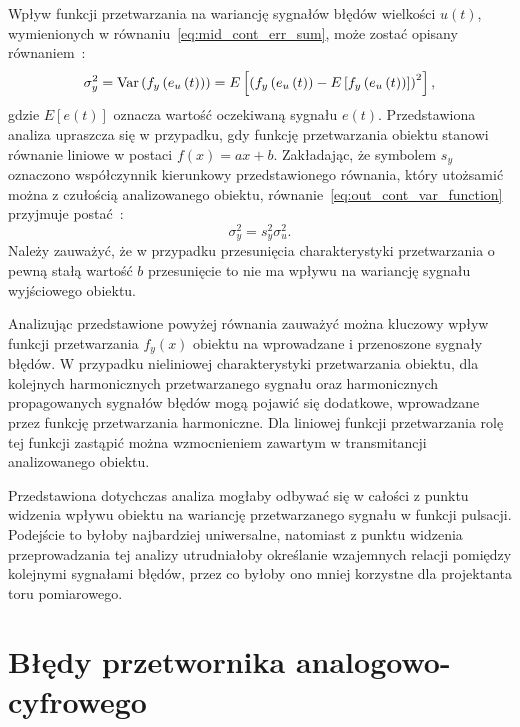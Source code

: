 Wpływ funkcji przetwarzania na wariancję sygnałów błędów wielkości $u(t)$, wymienionych w równaniu~\eqref{eq:mid_cont_err_sum}, może zostać opisany równaniem~\cite{oppenheim_sns}:
\begin{equation}
\sigma_{y}^{2} = \text{Var}\left(f_{y} \left(e_{u} \left(t\right)\right)\right) = E \left[ \left( f_{y} \left(e_{u} \left(t\right)\right) - E \left[ f_{y} \left(e_{u} \left(t\right)\right) \right] \right)^2 \right] \label{eq:out_cont_var_function},
\end{equation}
gdzie $E[e(t)]$ oznacza wartość oczekiwaną sygnału $e(t)$. Przedstawiona analiza upraszcza się w przypadku, gdy funkcję przetwarzania obiektu stanowi równanie liniowe w postaci $f(x) = ax+b$. Zakładając, że symbolem $s_{y}$ oznaczono współczynnik kierunkowy przedstawionego równania, który utożsamić można z czułością analizowanego obiektu, równanie~\eqref{eq:out_cont_var_function} przyjmuje postać~\cite{oppenheim_sns}:
\begin{equation}
\sigma_{y}^{2} = s_{y}^{2} \sigma_{u}^{2} \label{eq:out_cont_var_sense}.
\end{equation}
Należy zauważyć, że w przypadku przesunięcia charakterystyki przetwarzania o pewną stałą wartość $b$ przesunięcie to nie ma wpływu na wariancję sygnału wyjściowego obiektu.

Analizując przedstawione powyżej równania zauważyć można kluczowy wpływ funkcji przetwarzania $f_{y}(x)$ obiektu na wprowadzane i przenoszone sygnały błędów. W przypadku nieliniowej charakterystyki przetwarzania obiektu, dla kolejnych harmonicznych przetwarzanego sygnału oraz harmonicznych propagowanych sygnałów błędów mogą pojawić się dodatkowe, wprowadzane przez funkcję przetwarzania harmoniczne. Dla liniowej funkcji przetwarzania rolę tej funkcji zastąpić można wzmocnieniem zawartym w transmitancji analizowanego obiektu.

Przedstawiona dotychczas analiza mogłaby odbywać się w całości z punktu widzenia wpływu obiektu na wariancję przetwarzanego sygnału w funkcji pulsacji. Podejście to byłoby najbardziej uniwersalne, natomiast z punktu widzenia przeprowadzania tej analizy utrudniałoby określanie wzajemnych relacji pomiędzy kolejnymi sygnałami błędów, przez co byłoby ono mniej korzystne dla projektanta toru pomiarowego.

\section{Błędy przetwornika analogowo-cyfrowego}

